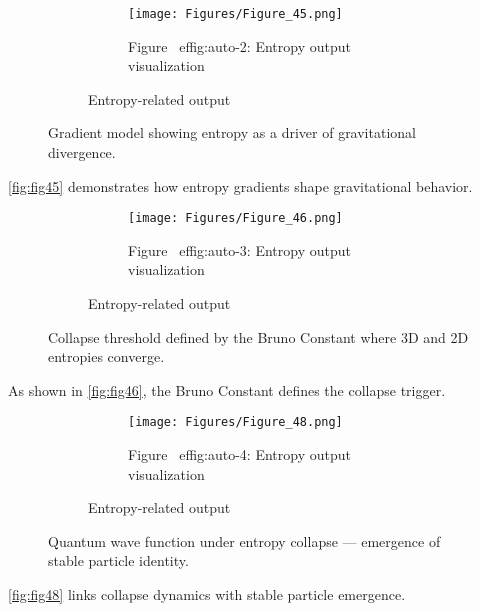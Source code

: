 \documentclass[12pt]{article}
\begin{document}
\begin{figure}[H]
    \centering
    \begin{figure}[H]
\centering
\begin{figure}[H]
\centering
\texttt{[image: Figures/Figure\_45.png]}
\caption{Figure~
ef{fig:auto-2}: Entropy output visualization}
\label{fig:auto-2}
\end{figure}
\caption{Entropy-related output}
\label{fig:Figures_Figure_45_png}
\end{figure}

    \caption{Gradient model showing entropy as a driver of gravitational divergence.}
    \label{fig:fig45}
\end{figure}
\autoref{fig:fig45} demonstrates how entropy gradients shape gravitational behavior.

\begin{figure}[H]
    \centering
    \begin{figure}[H]
\centering
\begin{figure}[H]
\centering
\texttt{[image: Figures/Figure\_46.png]}
\caption{Figure~
ef{fig:auto-3}: Entropy output visualization}
\label{fig:auto-3}
\end{figure}
\caption{Entropy-related output}
\label{fig:Figures_Figure_46_png}
\end{figure}

    \caption{Collapse threshold defined by the Bruno Constant where 3D and 2D entropies converge.}
    \label{fig:fig46}
\end{figure}
As shown in \autoref{fig:fig46}, the Bruno Constant defines the collapse trigger.

\begin{figure}[H]
    \centering
    \begin{figure}[H]
\centering
\begin{figure}[H]
\centering
\texttt{[image: Figures/Figure\_48.png]}
\caption{Figure~
ef{fig:auto-4}: Entropy output visualization}
\label{fig:auto-4}
\end{figure}
\caption{Entropy-related output}
\label{fig:Figures_Figure_48_png}
\end{figure}

    \caption{Quantum wave function under entropy collapse — emergence of stable particle identity.}
    \label{fig:fig48}
\end{figure}
\autoref{fig:fig48} links collapse dynamics with stable particle emergence.
\end{document}
